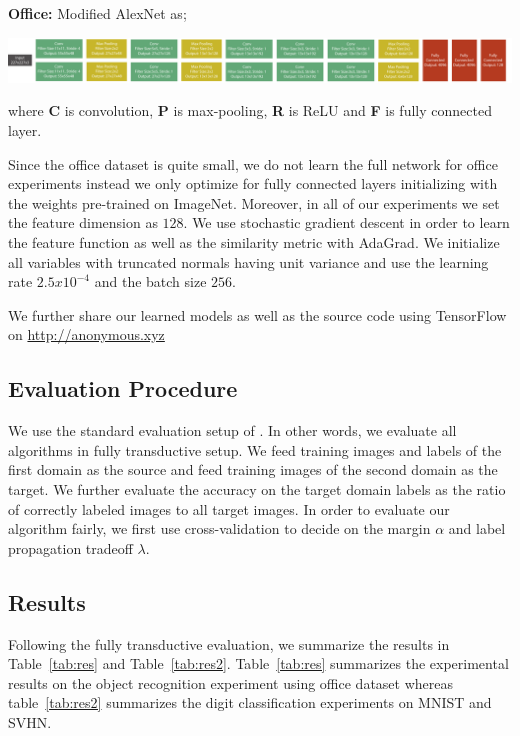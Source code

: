 \noindent \textbf{Office:} Modified AlexNet\cite{alexnet} as;

\includegraphics[width=\columnwidth]{alexnet}


where \textbf{C} is convolution, \textbf{P} is max-pooling, \textbf{R} is ReLU and \textbf{F} is fully connected layer. 

Since the office dataset is quite small, we do not learn the full network for office experiments instead we only optimize for fully connected layers initializing with the weights  pre-trained on ImageNet. Moreover, in all of our experiments we set the feature dimension as $128$. We use stochastic gradient descent in order to learn the feature function as well as the similarity metric with AdaGrad\cite{adagrad}. We initialize all variables with truncated normals having unit variance and use the learning rate $2.5x10^{-4}$ and the batch size $256$. 



We further share our learned models as well as the source code using TensorFlow\cite{tensorflow} on \url{http://anonymous.xyz}


\subsection{Evaluation Procedure}
We use the standard evaluation setup of \cite{office}. In other words, we evaluate all algorithms in fully transductive setup. We feed training images and labels of the first domain as the source and feed training images of the second domain as the target. We further evaluate the accuracy on the target domain labels as the ratio of correctly labeled images to all target images. In order to evaluate our algorithm fairly, we first use cross-validation to decide on the margin $\alpha$ and label propagation tradeoff $\lambda$. 


\subsection{Results}

Following the fully transductive evaluation, we summarize the results in Table~\ref{tab:res} and Table~\ref{tab:res2}. Table~\ref{tab:res} summarizes the experimental results on the object recognition experiment using office dataset whereas  table~\ref{tab:res2} summarizes the digit classification experiments on MNIST and SVHN.

